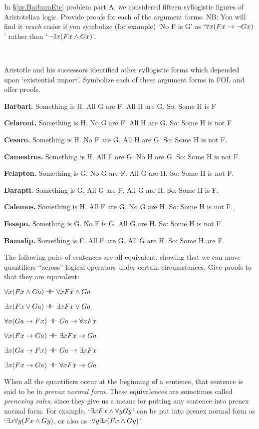 \problempart
\label{pr.BarbaraEtc.proof1}
In \S\ref{pr.BarbaraEtc} problem part A, we considered fifteen syllogistic figures of Aristotelian logic. Provide proofs for each of the argument forms. NB: You will find it \emph{much} easier if you symbolize (for example) `No F is G' as `$\forall x (Fx \rightarrow \neg Gx)$' rather than `$\neg \exists x(Fx \wedge Gx)$'.

\

\problempart
\label{pr.BarbaraEtc.proof2}
Aristotle and his successors identified other syllogistic forms which depended upon `existential import'. Symbolize each of these argument forms in FOL and offer proofs.
\begin{ebullet}
	\item \textbf{Barbari.} Something is H. All G are F. All H are G. So: Some H is F
	\item \textbf{Celaront.} Something is H. No G are F. All H are G. So: Some H is not F
	\item \textbf{Cesaro.} Something is H. No F are G. All H are G. So: Some H is not F.
	\item \textbf{Camestros.} Something is H. All F are G. No H are G. So: Some H is not F.
	\item \textbf{Felapton.} Something is G. No G are F. All G are H. So: Some H is not F.
	\item \textbf{Darapti.} Something is G. All G are F. All G are H. So: Some H is F.
	\item \textbf{Calemos.} Something is H. All F are G. No G are H. So: Some H is not F.
	\item \textbf{Fesapo.} Something is G. No F is G. All G are H. So: Some H is not F.
	\item \textbf{Bamalip.} Something is F. All F are G. All G are H. So: Some H are F.
\end{ebullet}



\problempart
The following pairs of sentences are all equivalent, showing that we can move quantifiers ``across'' logical operators under certain circumstances.  Give proofs to that they are equivalent:
\begin{earg}
\item $\forall x (Fx \eand Ga) \pequiv  \forall x Fx \eand Ga$
\item $\exists x (Fx \eor Ga) \pequiv \exists x Fx \eor Ga$
\item $\forall x(Ga \eif Fx) \pequiv Ga \eif \forall x Fx$
\item $\forall x(Fx \eif Ga) \pequiv \exists x Fx \eif Ga$
\item $\exists x(Ga \eif Fx) \pequiv Ga \eif \exists x Fx$
\item $\exists x(Fx \eif Ga) \pequiv \forall x Fx \eif Ga$
\end{earg}
When all the quantifiers occur at the beginning of a sentence, that sentence is said to be in \emph{prenex normal form}. These equivalences are sometimes called \emph{prenexing rules}, since they give us a means for putting any sentence into prenex normal form. For example, `$\exists x Fx \wedge \forall yGy$' can be put into prenex normal form as `$\exists x\forall y(Fx \wedge Gy)$, or also as `$\forall y \exists x(Fx \wedge Gy)$'.

